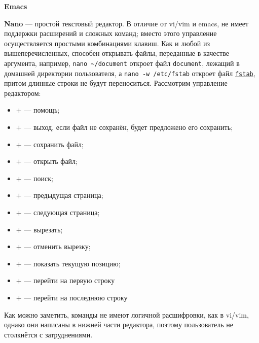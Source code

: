 \textbf{Emacs} %

\textbf{Nano} --- простой текстовый редактор. В отличие от vi/vim и emacs, не имеет поддержки расширений и сложных команд; вместо этого управление осуществляется простыми комбинациями клавиш. Как и любой из вышеперечисленных, способен открывать файлы, переданные в качестве аргумента, например, \texttt{nano \~{}/document} откроет файл \texttt{document}, лежащий в домашней директории пользователя, а \texttt{nano -w /etc/fstab} откроет файл \hyperref[fstab]{\texttt{fstab}}, притом длинные строки не будут переноситься.
Рассмотрим управление редактором:
\begin{itemize}
 \item \Ctrl$+$ --- помощь;
 \item \Ctrl$+$ --- выход, если файл не сохранён, будет предложено его сохранить;
 \item \Ctrl$+$ --- сохранить файл;
 \item \Ctrl$+$ --- открыть файл;
 \item \Ctrl$+$ --- поиск;
 \item \Ctrl$+$ --- предыдущая страница;
 \item \Ctrl$+$ --- следующая страница;
 \item \Ctrl$+$ --- вырезать;
 \item \Ctrl$+$ --- отменить вырезку;
 \item \Ctrl$+$ --- показать текущую позицию;
 \item \Alt$+$\keystroke{\textbackslash{}} --- перейти на первую строку
 \item \Alt$+$\keystroke{/} --- перейти на последнюю строку
\end{itemize}
Как можно заметить, команды не имеют логичной расшифровки, как в vi/vim, однако они написаны в нижней части редактора, поэтому пользователь не столкнётся с затруднениями.

